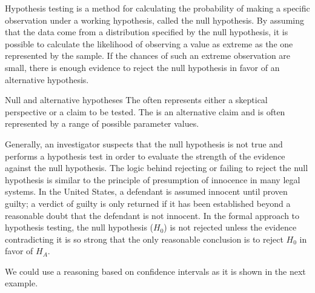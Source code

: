 Hypothesis testing is a method for calculating the probability of making a specific observation under a working hypothesis, called the null hypothesis. By assuming that the data come from a distribution specified by the null hypothesis, it is possible to calculate the likelihood of observing a value as extreme as the one represented by the sample. If the chances of such an extreme observation are small, there is enough evidence to reject the null hypothesis in favor of an alternative hypothesis. 

\begin{onebox}{Null and alternative hypotheses}
  {The  often represents either a skeptical perspective or a claim to be tested. The  is an alternative claim and is often represented by a range of possible parameter values.}
\end{onebox}

Generally, an investigator suspects that the null hypothesis is not true and performs a hypothesis test in order to evaluate the strength of the evidence against the null hypothesis. The logic behind rejecting or failing to reject the null hypothesis is similar to the principle of presumption of innocence in many legal systems. In the United States, a defendant is assumed innocent until proven guilty; a verdict of guilty is only returned if it has been established beyond a reasonable doubt that the defendant is not innocent. In the formal approach to hypothesis testing, the null hypothesis ($H_0$) is not rejected unless the evidence contradicting it is so strong that the only reasonable conclusion is to reject $H_0$ in favor of $H_A$. 

We could use a reasoning based on confidence intervals as it is shown in the next example. 

